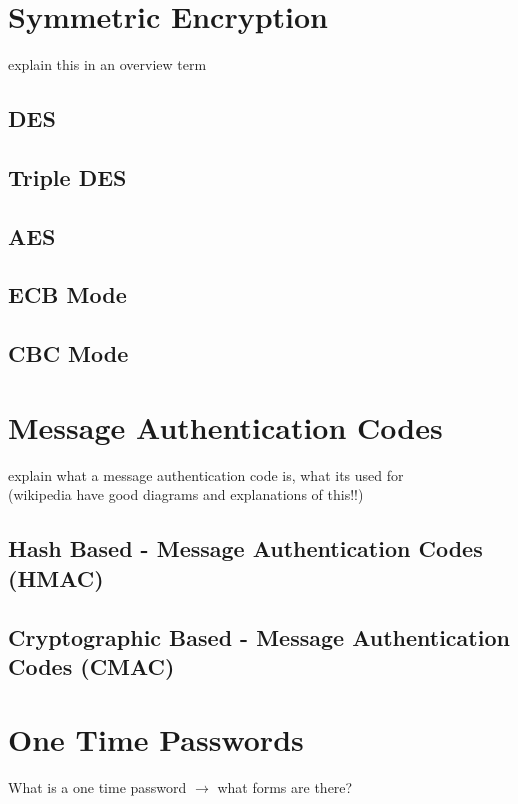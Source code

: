 \documentclass[bsc,frontabs,twoside,singlespacing,parskip,deptreport]{infthesis}     %
\begin{document}
\section{Symmetric Encryption}

\noindent explain this in an overview term

\subsection{DES}
\subsection{Triple DES}
\subsection{AES}

\subsection{ECB Mode}
\subsection{CBC Mode}


\section{Message Authentication Codes}

\noindent explain what a message authentication code is, what its used for\\
\noindent (wikipedia have good diagrams and explanations of this!!)

\subsection{Hash Based - Message Authentication Codes (HMAC)}
\subsection{Cryptographic Based - Message Authentication Codes (CMAC)}

\section{One Time Passwords}

\noindent What is a one time password $\rightarrow$ what forms are there?
\end{document}
